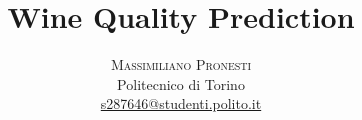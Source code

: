 \documentclass[twoside]{article}
\title{\vspace{-15mm}\fontsize{24pt}{10pt}\selectfont\textbf{Wine Quality Prediction}} %
\author{
	\large
	\textsc{Massimiliano Pronesti}\\[2mm] %
	\normalsize Politecnico di Torino \\ %
	\normalsize \href{mailto:s287646@studenti.polito.it}{s287646@studenti.polito.it} %
	\vspace{-5mm}
}
\date{}
\begin{document}
	
	\maketitle %
	

	\begin{multicols}{2} %
		
		
		
		

	\end{multicols}
	
\end{document}
